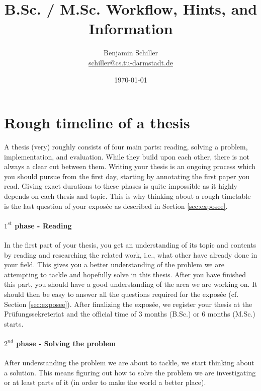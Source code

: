 \documentclass{article}
\title{B.Sc. / M.Sc. Workflow, Hints, and Information}
\author{Benjamin Schiller\\\url{schiller@cs.tu-darmstadt.de}}
\date{\today}
\begin{document}
\maketitle




\section{Rough timeline of a thesis}
A thesis (very) roughly consists of four main parts: reading, solving a problem, implementation, and evaluation.
While they build upon each other, there is not always a clear cut between them.
Writing your thesis is an ongoing process which you should pursue from the first day, starting by annotating the first paper you read.
Giving exact durations to these phases is quite impossible as it highly depends on each thesis and topic.
This is why thinking about a rough timetable is the last question of your expos\'{e}e as described in Section \ref{sec:exposee}.

\paragraph{$1^{st}$ phase - Reading}
In the first part of your thesis, you get an understanding of its topic and contents by reading and researching the related work, i.e., what other have already done in your field.
This gives you a better understanding of the problem we are attempting to tackle and hopefully solve in this thesis.
After you have finished this part, you should have a good understanding of the area we are working on.
It should then be easy to answer all the questions required for the expos\'{e}e (cf. Section \ref{sec:exposee}).
After finalizing the expos\'{e}e, we register your thesis at the Pr\"{u}fungssekreteriat and the official time of 3 months (B.Sc.) or 6 months (M.Sc.) starts.

\paragraph{$2^{nd}$ phase - Solving the problem}
After understanding the problem we are about to tackle, we start thinking about a solution.
This means figuring out how to solve the problem we are investigating or at least parts of it (in order to make the world a better place).
\end{document}
